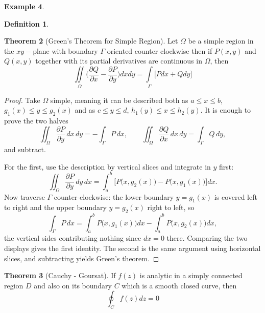 \documentclass[11pt,a4paper]{article}
\theoremstyle{definition}
\newtheorem{thm}{Theorem}[section]
\newtheorem{definition}[thm]{Definition}
\newtheorem{example}[thm]{Example}
\begin{document}
\begin{example}
\begin{definition}
\begin{figure}[H]
\centering
{}
\end{figure}
\end{definition}

\begin{thm}[Green's Theorem for Simple Region]
Let $\Omega$ be a simple region in the $xy-$plane with boundary $\Gamma$ oriented counter clockwise then if $P(x,y)$ and $Q(x,y)$ together with its partial derivatives are continuous in $\Omega$, then $$ \iint\limits_{\Omega} \Bigg(\frac{\partial Q}{\partial x} - \frac{\partial P}{\partial y}\Bigg)dxdy = \int\limits_{\Gamma} \Big[Pdx + Qdy\Big]$$
\end{thm}

\begin{proof}
Take $\Omega$ simple, meaning it can be described both as
$a\leq x\leq b$, $g_1(x)\leq y\leq g_2(x)$ and as
$c\leq y\leq d$, $h_1(y)\leq x\leq h_2(y)$. It is enough to prove the two
halves
$$\iint_{\Omega}\frac{\partial P}{\partial y}\,dx\,dy=-\int_{\Gamma}P\,dx,
\qquad
\iint_{\Omega}\frac{\partial Q}{\partial x}\,dx\,dy=\int_{\Gamma}Q\,dy,$$
and subtract.

For the first, use the description by vertical slices and integrate in $y$
first:
$$\iint_{\Omega}\frac{\partial P}{\partial y}\,dy\,dx
=\int_a^b\Big[P\big(x,g_2(x)\big)-P\big(x,g_1(x)\big)\Big]dx .$$
Now traverse $\Gamma$ counter-clockwise: the lower boundary $y=g_1(x)$ is
covered left to right and the upper boundary $y=g_2(x)$ right to left, so
$$\int_{\Gamma}P\,dx=\int_a^b P\big(x,g_1(x)\big)dx-\int_a^b P\big(x,g_2(x)\big)dx ,$$
the vertical sides contributing nothing since $dx=0$ there. Comparing the two
displays gives the first identity. The second is the same argument using
horizontal slices, and subtracting yields Green's theorem.
\end{proof}





\begin{thm}[Cauchy - Goursat]
If $f(z)$ is analytic in a simply connected region $D$ and also on its boundary $C$ which is a smooth closed curve, then $$\oint_C f(z) dz = 0$$
\end{thm}


\end{example}
\end{document}
